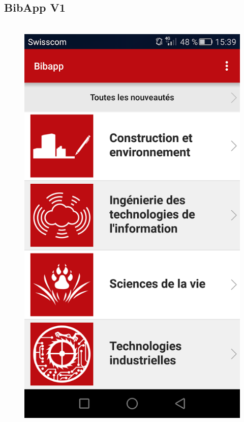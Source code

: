 \documentclass[10pt]{beamer}
\begin{document}
\subsection{BibApp V1}
\begin{frame}
	\frametitle{\secname}
	\framesubtitle{\subsecname}
	\begin{columns}[T]
		\begin{column}{.65\textwidth}
            \begin{columns}[T]
                \begin{column}{.3\textwidth}
                    \begin{figure}
                        \includegraphics[width=1\textwidth]{images/bibapp.png}

\end{figure}
\end{column}
\end{columns}
\end{column}
\end{columns}
\end{frame}
\end{document}
